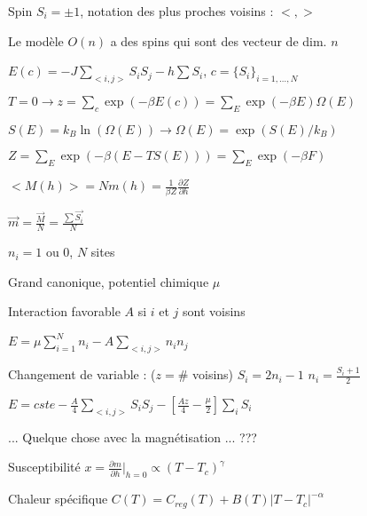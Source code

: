   \squishlist
   \item Spin $S_i=\pm 1$, notation des plus proches voisins : $< , >$
   \item Le modèle $O(n)$ a des spins qui sont des vecteur de dim. $n$
   \item $E(c)=-J\sum_{<i,j>}S_iS_j -h\sum{S_i}$, $c=\{ S_i \} _{i=1,\dots,N}$
   \item $T=0 \to z=\sum_c \exp{(-\beta E(c))} = \sum_E \exp{(-\beta E)}\Omega{(E)}$
   \item $S(E)=k_B\ln{(\Omega{(E)})} \to \Omega{(E)}=\exp{(S(E)/k_B)}$
   \item $Z=\sum_E \exp{(-\beta (E-TS(E)))}=\sum_E \exp{(-\beta F)}$
   \item $<M(h)> =Nm(h)=\frac{1}{\beta Z}\frac{\partial Z}{\partial h}$
   \item $\vec{m}=\frac{\vec{M}}{N}=\frac{\sum \vec{S_i}}{N}$
  \squishend
  \squishlist
   \item $n_i=1$ ou $0$, $N$ sites
   \item Grand canonique, potentiel chimique $\mu$
   \item Interaction favorable $A$ si $i$ et $j$ sont voisins
   \item $E=\mu\sum_{i=1}^N n_i - A\sum_{<i,j>}n_in_j$
   \item Changement de variable : ($z=\#$ voisins)
   \subitem $S_i=2n_i-1$
   \subitem $n_i=\frac{S_i+1}{2}$
   \item $E=cste-\frac{A}{4}\sum_{<i,j>}S_iS_j-\left[\frac{Az}{4}-\frac{\mu}{2}\right]\sum_i S_i$
   \item ... Quelque chose avec la magnétisation ... ???
  \squishend
  \squishlist %
   \item[] 
    \item Susceptibilité $x=\frac{\partial m}{\partial h}\vert_{h=0} \propto (T-T_c)^\gamma$
    \item Chaleur spécifique $C(T)=C_{reg}(T)+B(T)|T-T_c|^{-\alpha}$
